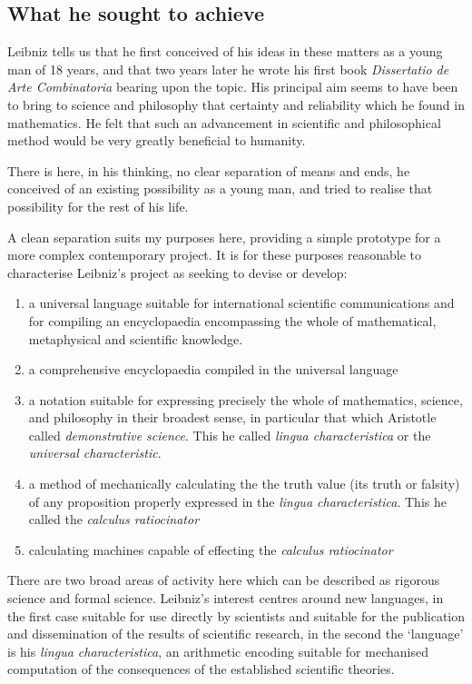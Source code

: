 \subsection{What he sought to achieve}

Leibniz tells us that he first conceived of his ideas in these matters as a young man of 18 years, and that two years later he wrote his first book \emph{Dissertatio de Arte Combinatoria}\cite{leibniz66}
bearing upon the topic.
His principal aim seems to have been to bring to science and philosophy that certainty and reliability which he found in mathematics.
He felt that such an advancement in scientific and philosophical method would be very greatly beneficial to humanity.

There is here, in his thinking, no clear separation of means and ends, he conceived of an existing possibility as a young man, and tried to realise that possibility for the rest of his life.

A clean separation suits my purposes here, providing a simple prototype for a more complex contemporary project.
It is for these purposes reasonable to characterise Leibniz's project as seeking to devise or develop:

\begin{enumerate}
\item a universal language suitable for international scientific communications and for compiling an encyclopaedia encompassing the whole of mathematical, metaphysical and scientific knowledge.
\item a comprehensive encyclopaedia compiled in the universal language
\item a notation suitable for expressing precisely the whole of mathematics, science, and philosophy in their broadest sense, in particular that which Aristotle called
\emph{demonstrative science}.
This he called \emph{lingua characteristica} or the {\it universal characteristic}.
\item a method of mechanically calculating the the truth value (its truth or falsity) of any proposition properly expressed in the \emph{lingua characteristica}.
  This he called the \emph{calculus ratiocinator}
  \item calculating machines capable of effecting the \emph{calculus ratiocinator}
\end{enumerate}

There are two broad areas of activity here which can be described as rigorous science and formal science.
Leibniz's interest centres around new languages, in the first case suitable for use directly by scientists and suitable for the publication and dissemination of the results of scientific research, in the second the `language' is his \emph{lingua characteristica}, an arithmetic encoding suitable for mechanised computation of the consequences of the established scientific theories.

